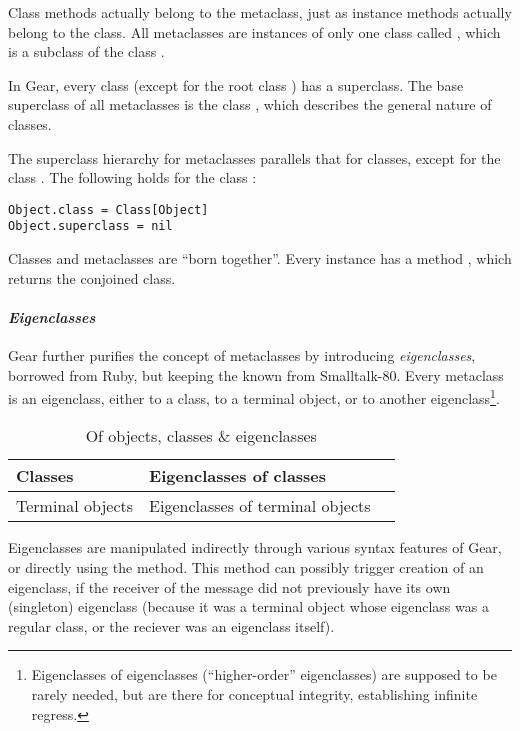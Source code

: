 Class methods actually belong to the metaclass, just as instance methods actually belong to the class. All metaclasses are instances of only one class called , which is a subclass of the class . 

In Gear, every class (except for the root class ) has a superclass. The base superclass of all metaclasses is the class , which describes the general nature of classes. 

The superclass hierarchy for metaclasses parallels that for classes, except for the class . The following holds for the class :
\begin{lstlisting}[deletekeywords={class}]
Object.class = Class[Object]
Object.superclass = nil
\end{lstlisting}

Classes and metaclasses are ``born together''. Every  instance has a method , which returns the conjoined class. 

\paragraph{\em Eigenclasses}
Gear further purifies the concept of metaclasses by introducing {\em eigenclasses}, borrowed from Ruby, but keeping the  known from Smalltalk-80. Every metaclass is an eigenclass, either to a class, to a terminal object, or to another eigenclass\footnote{Eigenclasses of eigenclasses (``higher-order'' eigenclasses) are supposed to be rarely needed, but are there for conceptual integrity, establishing infinite regress.}. 

\begin{table}[ht]
  \centering
  \caption{Of objects, classes \& eigenclasses}
  \renewcommand{\arraystretch}{1.7}
  \begin{tabular}{ | >{\centering}m{3.5cm} | >{\centering}m{3.5cm} | >{\centering\arraybackslash}m{6cm} | }
  	\hline
    Classes & Eigenclasses of classes & \multirow{2}{*}{Eigenclasses of eigenclasses} \\ \cline{1-2}
    Terminal objects & Eigenclasses of terminal objects & \\
    \hline
  \end{tabular}
\end{table}

Eigenclasses are manipulated indirectly through various syntax features of Gear, or directly using the  method. This method can possibly trigger creation of an eigenclass, if the receiver of the  message did not previously have its own (singleton) eigenclass (because it was a terminal object whose eigenclass was a regular class, or the reciever was an eigenclass itself). 

